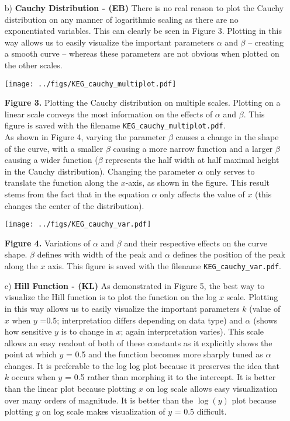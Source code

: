 \begin{itemize}
	\newpage	

	\item[b)]\textbf{Cauchy Distribution - (EB)} There is no real reason
		to plot the Cauchy distribution on any manner of logarithmic
		scaling as there are no exponentiated variables. This can
		clearly be seen in Figure 3. Plotting in this way allows
		us to easily visualize the important parameters $\alpha$ and
		$\beta$ -- creating a smooth curve -- whereas these parameters
		are not obvious when plotted on the other scales.  
	
		\begin{center}
	
		\texttt{[image: ../figs/KEG\_cauchy\_multiplot.pdf]}
	\end{center}	
	{\small \textbf{Figure 3.} Plotting the Cauchy distribution on
	multiple scales. Plotting on a linear scale conveys the most
	information on the effects of $\alpha$ and $\beta$. This figure is
	saved with the filename \texttt{KEG\_cauchy\_multiplot.pdf}.}\\


As shown in Figure 4, varying the
parameter $\beta$ causes a change in the shape of the curve, with a smaller
$\beta$ 
causing a more narrow function and a larger $\beta$ causing a wider function
($\beta$ represents the half width at half maximal height in the Cauchy
distribution). Changing the parameter $\alpha$ only serves to translate the
function along the $x$-axis, as shown in the figure. This result stems from the
fact that in the equation $\alpha$ only affects the value of $x$ (this changes the
center of the distribution).

\begin{center}
	\texttt{[image: ../figs/KEG\_cauchy\_var.pdf]}
\end{center}
	{\small \textbf{Figure 4.} Variations of $\alpha$ and $\beta$ and their respective effects on
	the curve shape. $\beta$ defines with width of the peak and $\alpha$
	defines the position of the peak along the $x$ axis. This figure is
	saved with the filename \texttt{KEG\_cauchy\_var.pdf}.}
	
\newpage

\item[c)]\textbf{Hill Function - (KL)} As demonstrated in Figure 5, the best way to visualize the Hill
function is to plot the function on the log $x$ scale. Plotting in this way
allows us to easily visualize the important parameters $k$ (value of $x$ when
$y$ =0.5; interpretation differs depending on data type)  and $\alpha$ (shows how
sensitive $y$ is to change in $x$; again interpretation varies). This scale allows
an easy readout of both of these constants as it explicitly shows the point at
which $y$ = 0.5 and the function becomes more sharply tuned as $\alpha$ changes. It
is preferable to the log log plot because it preserves the idea that $k$ occurs
when $y$ = 0.5 rather than morphing it to the intercept. It is better than the
linear plot because plotting $x$ on log scale allows easy visualization over
many orders of magnitude. It is better than the $\log(y)$ plot because
plotting $y$ on log scale makes visualization of $y$ = 0.5 difficult.



\end{itemize}
